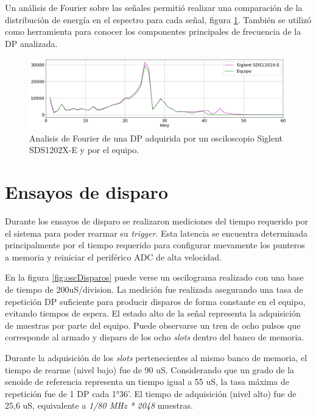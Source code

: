Un análisis de Fourier sobre las señales permitió realizar una comparación de la distribución de energía en el espectro para cada señal, figura \ref{fig:compEspectro}. También se utilizó como herramienta para conocer los componentes principales de frecuencia de la DP analizada.

\begin{figure}[ht]
	\centering
	\includegraphics[width=135mm]{./Figures/compEspectro.png}
	\caption{Analisis de Fourier de una DP adquirida por un osciloscopio Siglent SDS1202X-E y  por el equipo.}
	\label{fig:compEspectro}
\end{figure}


\section{Ensayos de disparo}
Durante los ensayos de disparo se realizaron mediciones del tiempo requerido por el sistema para poder rearmar su \textit{trigger}. Esta latencia se encuentra determinada principalmente por el tiempo requerido para configurar nuevamente los punteros a memoria y reiniciar el periférico ADC de alta velocidad. 

En la figura \ref{fig:oscDisparos} puede verse un oscilograma realizado con una base de tiempo de 200uS/division. La medición fue realizada asegurando una tasa de repetición DP suficiente para producir disparos de forma constante en el equipo, evitando tiempos de espera. El estado alto de la señal representa la adquisición de muestras por parte del equipo. Puede observarse un tren de ocho pulsos que corresponde al armado y disparo de los ocho \textit{slots} dentro del banco de memoria.

Durante la adquisición de los \textit{slots} pertenecientes al mismo banco de memoria, el tiempo de rearme (nivel bajo) fue de 90 uS. Considerando que un grado de la senoide de referencia representa un tiempo igual a 55 uS, la tasa máxima de repetición fue de 1 DP cada 1°36’. El tiempo de adquisición (nivel alto) fue de 25,6 uS, equivalente a \textit{1/80 MHz * 2048} muestras. 


